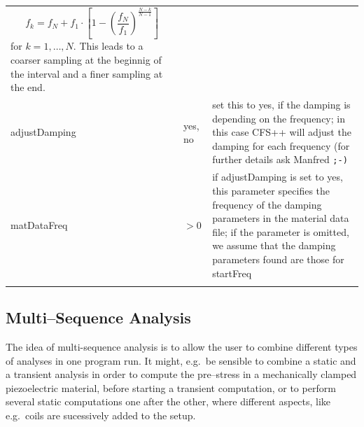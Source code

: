 \begin{center}
\begin{longtable}{llp{}}
                    \begin{displaymath}
                    f_k = f_N + f_1\cdot\left[ 1 -
                    \left(\frac{f_N}{f_1}\right)^{\frac{N-k}{N-1}}\right]
                    \end{displaymath}
                    for $k = 1,\ldots,N$.
                    This leads to a coarser sampling at the beginnig of the
                    interval and a finer sampling at the end.\\
\noalign{\smallskip}\hline\noalign{\smallskip}
adjustDamping & yes, no & set this to yes, if the damping is depending on the
                          frequency; in this case CFS++ will
                          adjust the damping for each frequency (for further
                          details ask Manfred \verb!;-)!\\
\noalign{\smallskip}\hline\noalign{\smallskip}
matDataFreq   & $>0$ & if adjustDamping is set to yes, this parameter
                       specifies the frequency of the damping parameters
                       in the material data file; if the parameter is omitted,
                       we assume that the damping parameters found are those
                       for startFreq\\
\noalign{\smallskip}\hline
\end{longtable}
\end{center}
%
%
\subsection{Multi--Sequence Analysis}
%
The idea of multi-sequence analysis is to allow the user to combine different
types of analyses in one program run. It might, e.g.~be sensible to combine a
static and a transient analysis in order to compute the pre--stress in a
mechanically clamped piezoelectric material, before starting a transient
computation, or to perform several static computations one after the other,
where different aspects, like e.g.~coils are sucessively added to the setup.

